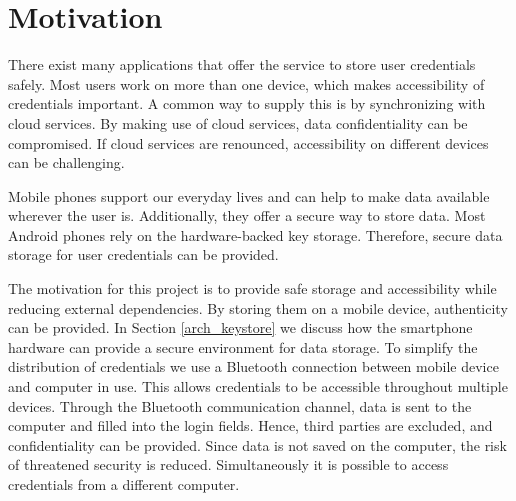 \section{Motivation} \label{motivation}
There exist many applications that offer the service to store user credentials safely. Most users work on more than one device, which makes accessibility of credentials important.
A common way to supply this is by synchronizing with cloud services. By making use of cloud services, data confidentiality can be compromised. If cloud services are renounced, accessibility on different devices can be challenging.

Mobile phones support our everyday lives and can help to make data available wherever the user is. Additionally, they offer a secure way to store data. Most Android phones rely on the hardware-backed key storage. Therefore, secure data storage for user credentials can be provided. 

The motivation for this project is to provide safe storage and accessibility while reducing external dependencies. By storing them on a mobile device, authenticity can be provided. In Section \ref{arch_keystore} we discuss how the smartphone hardware can provide a secure environment for data storage. To simplify the distribution of credentials we use a Bluetooth connection between mobile device and computer in use. This allows credentials to be accessible throughout multiple devices. Through the Bluetooth communication channel, data is sent to the computer and filled into the login fields. Hence, third parties are excluded, and confidentiality can be provided. Since data is not saved on the computer, the risk of threatened security is reduced. Simultaneously it is possible to access credentials from a different computer. 

